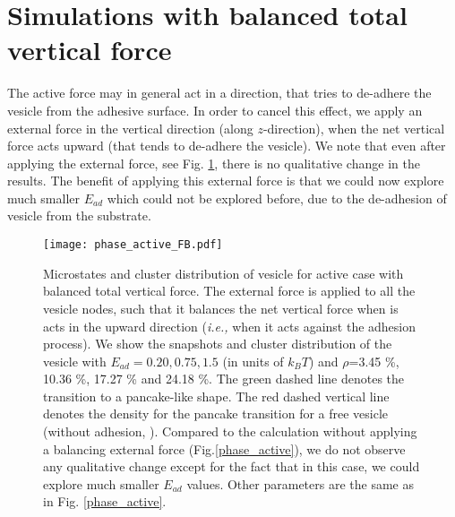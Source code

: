 \documentclass[pre,amsmath]{revtex4}
\begin{document}
\section{Simulations with balanced total vertical force}
\label{sec:Fz_balance}
The active force may in general act in a direction, that tries to de-adhere the vesicle from the adhesive surface. In order to cancel this effect, we apply an external force in the vertical direction (along $z$-direction), when the net vertical force acts upward (that tends to de-adhere the vesicle). We note that even after applying the external force, see Fig. \ref{phase_active_FB}, there is no qualitative change in the results. The benefit of applying this external force is that we could now explore much smaller $E_{ad}$ which could not be explored before, due to the de-adhesion of vesicle from the substrate.
\begin{figure}[ht]
\centering
\texttt{[image: phase\_active\_FB.pdf]}
\caption{Microstates and cluster distribution of vesicle for active case with balanced total vertical force. The external force is applied to all the vesicle nodes, such that it balances the net vertical force when is acts in the upward direction (\textit{i.e.,} when it acts against the adhesion process). We show the snapshots and cluster distribution of the vesicle with $E_{ad}=0.20, 0.75, 1.5$ (in units of $k_B T$) and $\rho$=3.45 \%, 10.36 \%, 17.27 \% and 24.18 \%. The green dashed line denotes the transition to a pancake-like shape. The red dashed vertical line denotes the density for the pancake transition for a free vesicle (without adhesion, \cite{miha2019}). Compared to the calculation without applying a balancing external force (Fig.\ref{phase_active}), we do not observe any qualitative change except for the fact that in this case, we could explore much smaller $E_{ad}$ values. Other parameters are the same as in Fig. \ref{phase_active}.}
\label{phase_active_FB} 
\end{figure}
\end{document}
